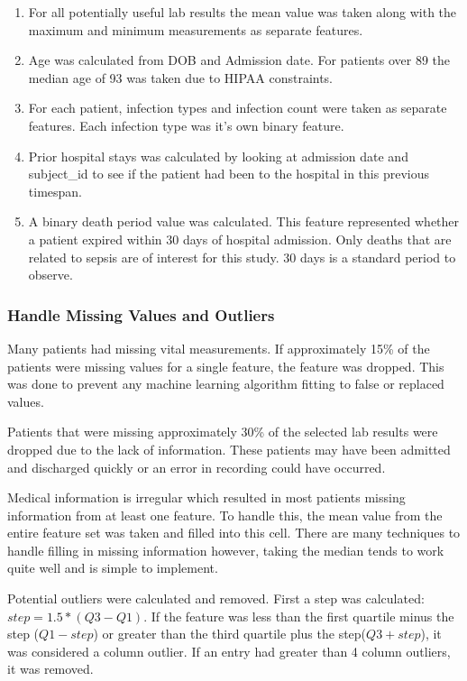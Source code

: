 \documentclass[11pt]{article}
\begin{document}
		\begin{enumerate}
			\item For all potentially useful lab results the mean value was taken along with the maximum and minimum measurements as separate features.
			\item Age was calculated from DOB and Admission date. For patients over 89 the median age of 93 was taken due to HIPAA constraints.
			\item For each patient, infection types and infection count were taken as separate features. Each infection type was it's own binary feature.
			\item Prior hospital stays was calculated by looking at admission date and subject\_id to see if the patient had been to the hospital in this previous timespan.
			\item A binary death period value was calculated. This feature represented whether a patient expired within 30 days of hospital admission. Only deaths that are related to sepsis are of interest for this study. 30 days is a standard period to observe.
		\end{enumerate}
	
		\subsubsection{Handle Missing Values and Outliers}
	
		Many patients had missing vital measurements. If approximately 15\% of the patients were missing values for a single feature, the feature was dropped. This was done to prevent any machine learning algorithm fitting to false or replaced values.
		
		Patients that were missing approximately 30\% of the selected lab results were dropped due to the lack of information. These patients may have been admitted and discharged quickly or an error in recording could have occurred.
		
		Medical information is irregular which resulted in most patients missing information from at least one feature. To handle this, the mean value from the entire feature set was taken and filled into this cell. There are many techniques to handle filling in missing information however, taking the median tends to work quite well and is simple to implement.
		
		Potential outliers were calculated and removed. First a step was calculated: \(step = 1.5*(Q3-Q1)\). If the feature was less than the first quartile minus the step (\(Q1 - step\)) or greater than the third quartile plus the step(\(Q3 + step\)), it was considered a column outlier. If an entry had greater than 4 column outliers, it was removed.
		
\end{document}
